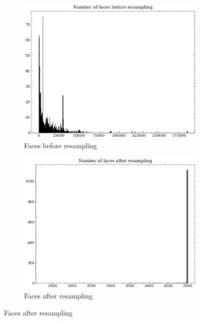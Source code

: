 \begin{figure}[H]
    \centering
    \begin{subfigure}[b]{0.45\textwidth}
        \centering
        \includegraphics[width=\textwidth]{assets/preprocessing/Number_of_faces_before_resampling.png}
        \caption{Faces before resampling}
        \label{fig:resampling-faces-before}
    \end{subfigure}
    \hfill
    \begin{subfigure}[b]{0.45\textwidth}
        \centering
        \includegraphics[width=\textwidth]{assets/preprocessing/Number_of_faces_after_resampling.png}
        \caption{Faces after resampling}
        \label{fig:resampling-faces-after}
    \end{subfigure}


\end{figure}
